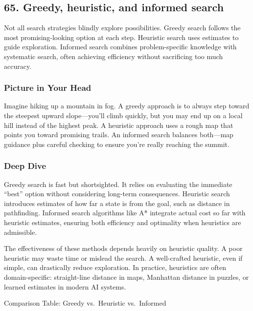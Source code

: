 \documentclass[
  letterpaper,
  DIV=11,
  numbers=noendperiod]{scrreprt}
\begin{document}
\subsection{65. Greedy, heuristic, and informed
search}\label{greedy-heuristic-and-informed-search}

Not all search strategies blindly explore possibilities. Greedy search
follows the most promising-looking option at each step. Heuristic search
uses estimates to guide exploration. Informed search combines
problem-specific knowledge with systematic search, often achieving
efficiency without sacrificing too much accuracy.

\subsubsection{Picture in Your Head}\label{picture-in-your-head-64}

Imagine hiking up a mountain in fog. A greedy approach is to always step
toward the steepest upward slope---you'll climb quickly, but you may end
up on a local hill instead of the highest peak. A heuristic approach
uses a rough map that points you toward promising trails. An informed
search balances both---map guidance plus careful checking to ensure
you're really reaching the summit.

\subsubsection{Deep Dive}\label{deep-dive-64}

Greedy search is fast but shortsighted. It relies on evaluating the
immediate ``best'' option without considering long-term consequences.
Heuristic search introduces estimates of how far a state is from the
goal, such as distance in pathfinding. Informed search algorithms like
A* integrate actual cost so far with heuristic estimates, ensuring both
efficiency and optimality when heuristics are admissible.

The effectiveness of these methods depends heavily on heuristic quality.
A poor heuristic may waste time or mislead the search. A well-crafted
heuristic, even if simple, can drastically reduce exploration. In
practice, heuristics are often domain-specific: straight-line distance
in maps, Manhattan distance in puzzles, or learned estimates in modern
AI systems.

Comparison Table: Greedy vs.~Heuristic vs.~Informed
\end{document}
